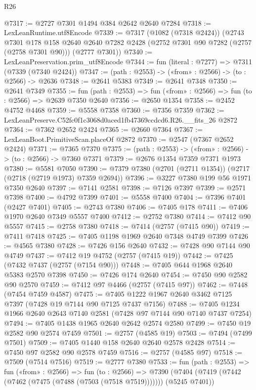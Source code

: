 \begin{lexlean}{R26}
\begin{coremodule}
@7317 := @2727 @7301 @1494 @384 @2642 @2640 @7284
@7318 := LexLeanRuntime.utf8Encode
@7339 := @7317
    (@1082 (@7318 @2424))
    (@2743
      @7301
      @178
      @158
      @2640
      @2640
      @7282
      @2428
      (@2752 @7301 @90 @7282 (@2757 (@2758 @7301 @90)))
      (@2777 @7301))
@7340 := LexLeanPreservation.prim_utf8Encode
@7344 := fun (literal : @7277) => @7311 (@7339 (@7340 @2424))
@7347 := (path : @2553) -> («from» : @2566) -> (to : @2566) -> @2636
@7348 := @2641 @5383
@7349 := @2641 @7348
@7350 := @2641 @7349
@7355 := fun (path : @2553) => fun («from» : @2566) => fun (to : @2566) => @2639 @7350 @2640
@7356 := @2650 @1354
@7358 := @2452 @4752 @4468
@7359 := @5558 @7358
@7360 := @7356 @7359
@7362 := LexLeanPreserve.C52fc0f1c3068d0aced1fb47369ccdcd6.R26.__fits_26 @2872
@7364 := @7362 @2652 @2424
@7365 := @2660 @7364
@7367 := LexLeanBoot.PrimitiveScan.placeOf @2872
@7370 := @2547 (@7367 @2652 @2424)
@7371 := @7365 @7370
@7375 := (path : @2553) -> («from» : @2566) -> (to : @2566) -> @7360 @7371
@7379 := @2676 @1354 @7359 @7371 @1973
@7380 := @5581 @7050
@7390 := @7379 @7380 (@2701 (@2711 @1354)) (@2717 (@2718 (@2719 @1973) @7359 @2694))
@7396 := @3227 @7380 @199 @56 @1971 @7350 @2640
@7397 := @7141 @2581
@7398 := @7126 @7397
@7399 := @2571 @7398
@7400 := @4792 @7399
@7401 := @5558 @7400
@7404 := @7396 @7401 (@2427 @7401)
@7405 := @2743 @7380
@7406 := @7405 @178
@7411 := @7406 @1970 @2640 @7349 @5557 @7400
@7412 := @2752 @7380
@7414 := @7412 @90 @5557
@7415 := @2758 @7380
@7418 := @7414 (@2757 (@7415 @90))
@7419 := @7411 @7418
@7425 := @7405 @1198 @1969 @2640 @7348 @4749 @7399
@7426 := @4565 @7380
@7428 := @7426 @156 @2640
@7432 := @7428 @90 @7144 @90 @4749
@7437 := @7412 @19 @4752 (@2757 (@7415 @19))
@7442 := @7425 (@7432 @7437 (@2757 (@7154 @90)))
@7448 := @7405 @644 @1968 @2640 @5383 @2570 @7398
@7450 := @7426 @174 @2640
@7454 := @7450 @90 @2582 @90 @2570
@7459 := @7412 @97 @4466 (@2757 (@7415 @97))
@7462 := @7448 (@7454 @7459 @4587)
@7475 := @7405 @1222 @1967 @2640 @3462 @7125 @7397 (@7428 @19 @7144 @90 @7125 @7437 @7156)
@7488 := @7405 @1234 @1966 @2640 @2643 @7140 @2581 (@7428 @97 @7144 @90 @7140 @7437 @7254)
@7494 := @7405 @1438 @1965 @2640 @2642 @2574 @2580
@7499 := @7450 @19 @2582 @90 @2574 @7459
@7501 := @2757 (@4585 @19)
@7503 := @7494 (@7499 @7501)
@7509 := @7405 @1440 @158 @2640 @2640 @2578 @2428
@7514 := @7450 @97 @2582 @90 @2578 @7459
@7516 := @2757 (@4585 @97)
@7518 := @7509 (@7514 @7516)
@7519 := @2777 @7380
@7533 := fun (path : @2553) =>
  fun («from» : @2566) =>
  fun (to : @2566) =>
  @7390 (@7404 (@7419 (@7442 (@7462 (@7475 (@7488 (@7503 (@7518 @7519))))))) (@5245 @7401))

\end{coremodule}
\end{lexlean}
